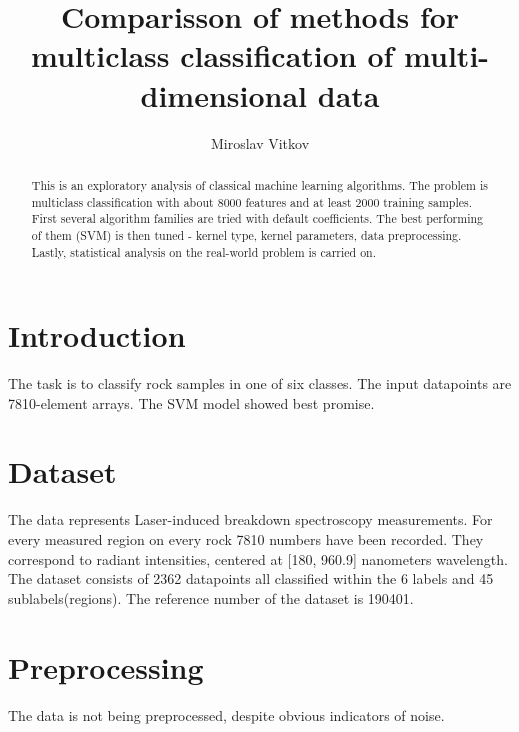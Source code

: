 \documentclass{article}
\title{Comparisson of methods for multiclass classification of multi-dimensional data}
\author{Miroslav Vitkov}
\begin{document}
\maketitle


\begin{abstract}
This is an exploratory analysis of classical machine learning algorithms.
The problem is multiclass classification with about 8000 features and at least 2000 training samples.
First several algorithm families are tried with default coefficients.
The best performing of them (SVM) is then tuned - kernel type, kernel parameters, data preprocessing.
Lastly, statistical analysis on the real-world problem is carried on.
\end{abstract}


\section{Introduction}
The task is to classify rock samples in one of six classes.
The input datapoints are 7810-element arrays.
The SVM model showed best promise.


\section{Dataset}
The data represents Laser-induced breakdown spectroscopy\cite{libs_intro} measurements.
For every measured region on every rock 7810 numbers have been recorded.
They correspond to radiant intensities, centered at [180, 960.9] nanometers wavelength.
\\
The dataset consists of 2362 datapoints all classified within the 6 labels and 45 sublabels(regions).
The reference number of the dataset is 190401.


\section{Preprocessing}
The data is not being preprocessed, despite obvious indicators of noise.
\end{document}
